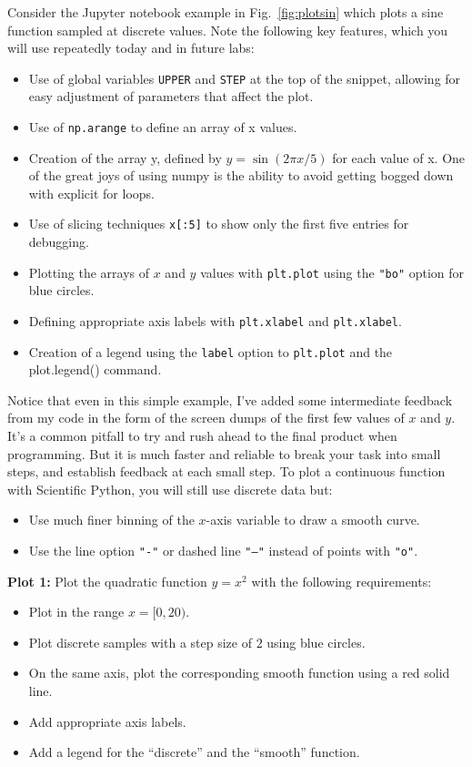 Consider the Jupyter notebook example in Fig.~\ref{fig:plotsin} which
plots a sine function sampled at discrete values.  Note the following
key features, which you will use repeatedly today and in future labs:
\begin{itemize}
\item Use of global variables {\tt UPPER} and {\tt STEP} at the top of
  the snippet, allowing for easy adjustment of parameters that affect
  the plot.
\item Use of {\tt np.arange} to define an array of x values.
\item Creation of the array y, defined by $y = \sin(2\pi x / 5)$ for each value of x.  One of the great joys of using numpy is the ability to avoid getting bogged down with explicit for loops.
\item Use of slicing techniques {\tt x[:5]} to show only the first five entries for debugging.  
\item Plotting the arrays of $x$ and $y$ values with {\tt plt.plot}  using the {\tt "bo"} option for blue circles.
\item Defining appropriate axis labels with {\tt plt.xlabel} and {\tt plt.xlabel}. 
\item Creation of a legend using the {\tt label} option to {\tt plt.plot} and the {plot.legend()} command.
\end{itemize}
Notice that even in this simple example, I've added some intermediate
feedback from my code in the form of the screen dumps of the first few
values of $x$ and $y$.  It's a common pitfall to try and rush ahead to
the final product when programming.  But it is much faster and
reliable to break your task into small steps, and establish feedback
at each small step.  To plot a continuous function with Scientific
Python, you will still use discrete data but:

\begin{itemize}
 \item Use much finer binning of the $x$-axis variable to draw a smooth curve. 
 \item Use the line option {\tt "-"} or dashed line {\tt "--"} instead of points with {\tt "o"}. 
\end{itemize} 

\noindent
{\bf Plot 1:}  Plot the quadratic function $y = x^2$ with the following requirements:
\begin{itemize}
 \item Plot in the range $x = [0,20)$.
 \item Plot discrete samples with a step size of $2$ using blue circles.
 \item On the same axis, plot the corresponding smooth function using a red solid line.
 \item Add appropriate axis labels. 
 \item Add a legend for the ``discrete'' and the ``smooth''  function.
\end{itemize}

